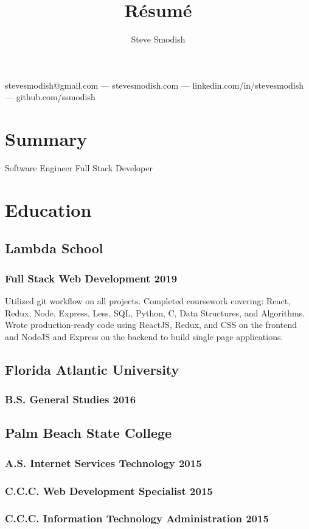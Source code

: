 \documentclass{article}
\makeatletter
\renewcommand{\maketitle}{
\begin{center}
{\huge\bfseries
\theauthor}

\vspace{.25em}
stevesmodish@gmail.com --- stevesmodish.com --- linkedin.com/in/stevesmodish --- github.com/ssmodish

\end{center}
}
\makeatother
\begin{document}
\title{R\'esum\'e}
\author{Steve Smodish}

\maketitle

\section{Summary}
Software Engineer
Full Stack Developer



\section{Education}
\subsection{Lambda School}
\subsubsection{Full Stack Web Development 2019}
Utilized git workflow on all projects.
Completed coursework covering: React, Redux, Node, Express, Less, SQL, Python, C, Data Structures, and Algorithms.
Wrote production-ready code using ReactJS, Redux, and CSS on the frontend and NodeJS and Express on the backend to build single page applications.

\subsection{Florida Atlantic University}
\subsubsection{B.S. General Studies 2016}

\subsection{Palm Beach State College}
\subsubsection{A.S. Internet Services Technology 2015}
\subsubsection{C.C.C. Web Development Specialist 2015}
\subsubsection{C.C.C. Information Technology Administration 2015}
\end{document}
